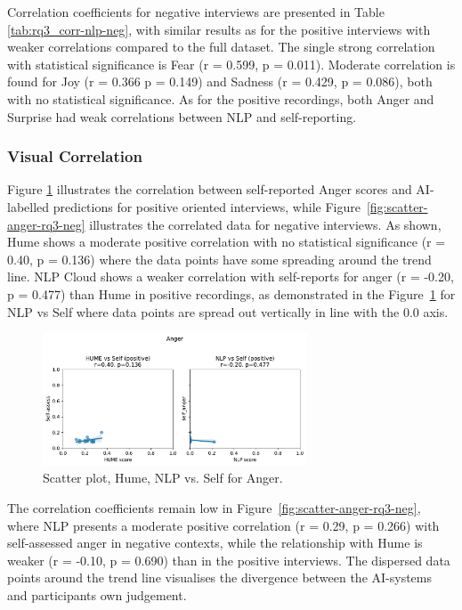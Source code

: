   
Correlation coefficients for negative interviews are presented in Table \ref{tab:rq3_corr-nlp-neg}, with similar results as for the positive interviews with weaker correlations compared to the full dataset. The single strong correlation with statistical significance is Fear (r = 0.599, p = 0.011). 
Moderate correlation is found for Joy (r = 0.366 p = 0.149) and Sadness (r = 0.429, p = 0.086), both with no statistical significance. As for the positive recordings, both Anger and Surprise had weak correlations between NLP and self-reporting. 


\subsubsection{Visual Correlation}

Figure \ref{fig:scatter-anger-rq3-pos} illustrates the correlation between self-reported Anger scores and AI-labelled predictions for positive oriented interviews, while Figure~\ref{fig:scatter-anger-rq3-neg} illustrates the correlated data for negative interviews. 
As shown, Hume shows a moderate positive correlation with no statistical significance (r = 0.40, p = 0.136) where the data points have some spreading around the trend line. NLP Cloud shows a weaker correlation with self-reports for anger (r = -0.20, p = 0.477) than Hume in positive recordings, 
as demonstrated in the Figure~\ref{fig:scatter-anger-rq3-pos} for NLP vs Self where data points are spread out vertically in line with the 0.0 axis. 
\begin{figure}[H]
    \centering
    \includegraphics[width=0.7\textwidth]{png/results/rq3/scatter_anger_vs_self_positive.pdf}
    \caption{Scatter plot, Hume, NLP vs. Self for Anger.}
    \label{fig:scatter-anger-rq3-pos}
\end{figure}
The correlation coefficients remain low in Figure~\ref{fig:scatter-anger-rq3-neg}, where NLP presents a moderate positive correlation (r = 0.29, p = 0.266) with self-assessed anger in negative contexts, while the relationship with Hume is weaker (r = -0.10, p = 0.690) than in the positive interviews. The dispersed data points around the trend line visualises the divergence between the AI-systems and participants own judgement. 

